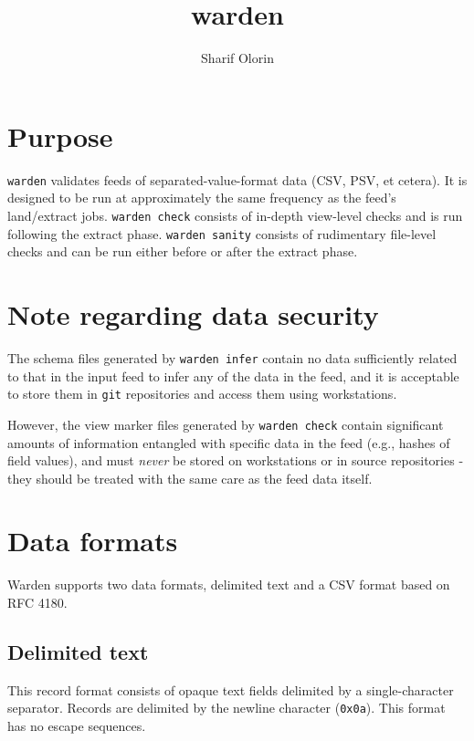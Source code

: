 \documentclass[a4paper]{article}
\title{warden}
\author{Sharif Olorin}
\begin{document}
\maketitle

\tableofcontents

\newpage

\section{Purpose}\label{usage}

\texttt{warden} validates feeds of separated-value-format data (CSV,
PSV, et cetera). It is designed to be run at approximately the same
frequency as the feed's land/extract jobs. \texttt{warden check}
consists of in-depth view-level checks and is run following the
extract phase. \texttt{warden sanity} consists of rudimentary
file-level checks and can be run either before or after the extract
phase.

\section{Note regarding data security}\label{note-regarding-data-security}

The schema files generated by \texttt{warden infer} contain no data
sufficiently related to that in the input feed to infer any of the
data in the feed, and it is acceptable to store them in
\texttt{git} repositories and access them using workstations.

However, the view marker files generated by \texttt{warden check}
contain significant amounts of information entangled with specific data in
the feed (e.g., hashes of field values), and must \textit{never}
be stored on workstations or in source repositories - they should be
treated with the same care as the feed data itself.

\section{Data formats}\label{data-formats}

Warden supports two data formats, delimited text and a CSV format based on RFC 4180.\cite{rfc4180}

\subsection{Delimited text}

This record format consists of opaque text fields delimited by a
single-character separator. Records are delimited by the newline
character (\texttt{0x0a}). This format has no escape sequences.
\end{document}
